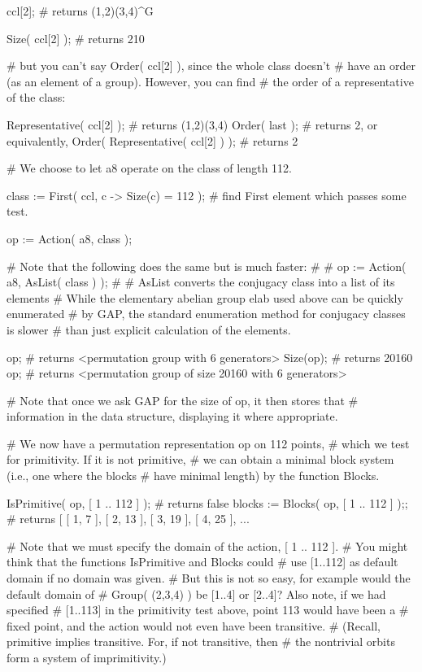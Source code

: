 ccl[2];   # returns (1,2)(3,4)^G

Size( ccl[2] );   # returns 210

# but you can't say Order( ccl[2] ), since the whole class doesn't 
# have an order (as an element of a group).  However, you can find 
# the order of a representative of the class:

Representative( ccl[2] );          # returns (1,2)(3,4)
Order( last );                     # returns 2, or equivalently,
Order( Representative( ccl[2] ) ); # returns 2

# We choose to let a8 operate on the class of length 112.

class := First( ccl, c -> Size(c) = 112 );  # find First element which passes some test.

op := Action( a8, class );

# Note that the following does the same but is much faster:
#
# op := Action( a8, AsList( class ) );
#
# AsList converts the conjugacy class into a list of its elements 
# While the elementary abelian group elab used above can be quickly enumerated 
# by GAP, the standard enumeration method for conjugacy classes is slower
# than just explicit calculation of the elements.

op;        # returns <permutation group with 6 generators>
Size(op);  # returns 20160
op;        # returns <permutation group of size 20160 with 6 generators>

# Note that once we ask GAP for the size of op, it then stores that 
# information in the data structure, displaying it where appropriate.

# We now have a permutation representation op on 112 points, 
# which we test for primitivity. If it is not primitive, 
# we can obtain a minimal block system (i.e., one where the blocks 
# have minimal length) by the function Blocks.

IsPrimitive( op, [ 1 .. 112 ] );  # returns false
blocks := Blocks( op, [ 1 .. 112 ] );;
# returns [ [ 1, 7 ], [ 2, 13 ], [ 3, 19 ], [ 4, 25 ], ...

# Note that we must specify the domain of the action, [ 1 .. 112 ].
# You might think that the functions IsPrimitive and Blocks could 
# use [1..112] as default domain if no domain was given. 
# But this is not so easy, for example would the default domain of 
# Group( (2,3,4) ) be [1..4] or [2..4]?  Also note, if we had specified 
# [1..113] in the primitivity test above, point 113 would have been a 
# fixed point, and the action would not even have been transitive.  
# (Recall, primitive implies transitive.  For, if not transitive, then
# the nontrivial orbits form a system of imprimitivity.)

